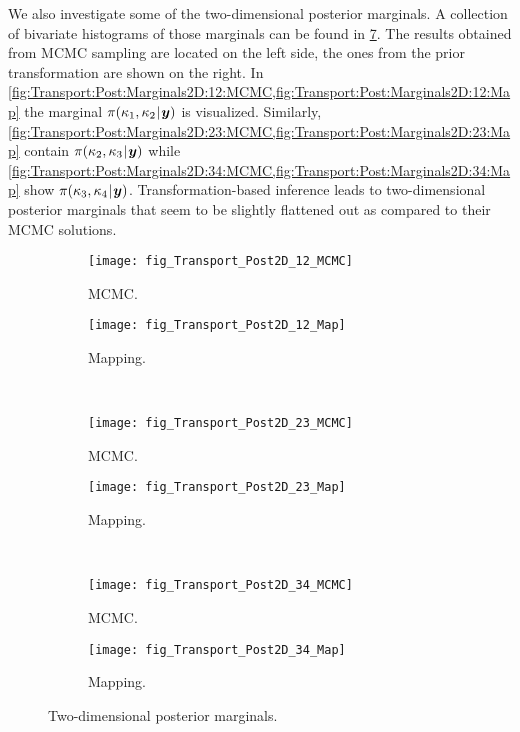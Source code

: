 We also investigate some of the two-dimensional posterior marginals.
A collection of bivariate histograms of those marginals can be found in \cref{fig:Transport:Post:Marginals2D}.
The results obtained from MCMC sampling are located on the left side, the ones from the prior transformation are shown on the right.
In \cref{fig:Transport:Post:Marginals2D:12:MCMC,fig:Transport:Post:Marginals2D:12:Map} the marginal \(\pi(\kappa_1,\kappa_2 {\:\!}|{\:\!} \bm{y})\) is visualized.
Similarly, \cref{fig:Transport:Post:Marginals2D:23:MCMC,fig:Transport:Post:Marginals2D:23:Map} contain \(\pi(\kappa_2,\kappa_3 {\:\!}|{\:\!} \bm{y})\)
while \cref{fig:Transport:Post:Marginals2D:34:MCMC,fig:Transport:Post:Marginals2D:34:Map} show \(\pi(\kappa_3,\kappa_4 {\:\!}|{\:\!} \bm{y})\).
Transformation-based inference leads to two-dimensional posterior marginals that seem to be slightly flattened out as compared to their MCMC solutions.
\begin{figure}[htbp]
  \centering
  \begin{subfigure}[b]{\MAPsubWidth}
    \centering
    \texttt{[image: fig\_Transport\_Post2D\_12\_MCMC]}
    \caption{MCMC.}
    \label{fig:Transport:Post:Marginals2D:12:MCMC}
  \end{subfigure}\hfill%
  \begin{subfigure}[b]{\MAPsubWidth}
    \centering
    \texttt{[image: fig\_Transport\_Post2D\_12\_Map]}
    \caption{Mapping.}
    \label{fig:Transport:Post:Marginals2D:12:Map}
  \end{subfigure}\\[3ex]%
  \begin{subfigure}[b]{\MAPsubWidth}
    \centering
    \texttt{[image: fig\_Transport\_Post2D\_23\_MCMC]}
    \caption{MCMC.}
    \label{fig:Transport:Post:Marginals2D:23:MCMC}
  \end{subfigure}\hfill%
  \begin{subfigure}[b]{\MAPsubWidth}
    \centering
    \texttt{[image: fig\_Transport\_Post2D\_23\_Map]}
    \caption{Mapping.}
    \label{fig:Transport:Post:Marginals2D:23:Map}
  \end{subfigure}\\[3ex]%
  \begin{subfigure}[b]{\MAPsubWidth}
    \centering
    \texttt{[image: fig\_Transport\_Post2D\_34\_MCMC]}
    \caption{MCMC.}
    \label{fig:Transport:Post:Marginals2D:34:MCMC}
  \end{subfigure}\hfill%
  \begin{subfigure}[b]{\MAPsubWidth}
    \centering
    \texttt{[image: fig\_Transport\_Post2D\_34\_Map]}
    \caption{Mapping.}
    \label{fig:Transport:Post:Marginals2D:34:Map}
  \end{subfigure}%
  \caption[Two-dimensional posterior marginals]{Two-dimensional posterior marginals.}
  \label{fig:Transport:Post:Marginals2D}
\end{figure}
